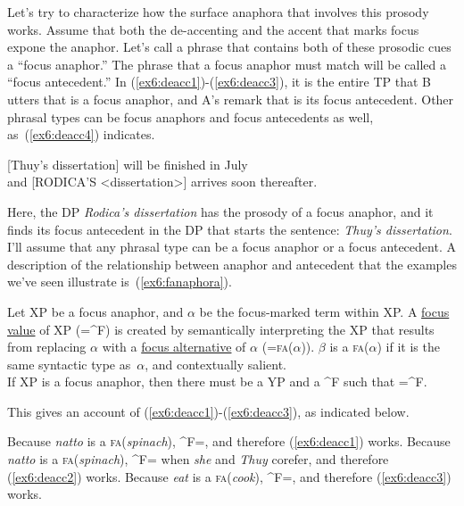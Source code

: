 Let's try to characterize how the surface anaphora that involves this prosody works. Assume that both the de-accenting and the accent that marks focus expone the anaphor. Let's call a phrase that contains both of these prosodic cues a ``focus anaphor.''  %
%
%
%
The phrase that a focus anaphor must match will be called a ``focus antecedent.'' In (\ref{ex6:deacc1})-(\ref{ex6:deacc3}), it is the entire TP that B utters that is a focus anaphor, and A's remark that is its focus antecedent. Other phrasal types can be focus anaphors and focus antecedents as well, as~(\ref{ex6:deacc4}) indicates.
\begin{exe}
	\raggedright
	\ex \label{ex6:deacc4}
	{}[\DP Thuy's dissertation] will be finished in July\\ and [\DP RODICA'S <dissertation>] arrives soon thereafter.
\end{exe}
Here, the DP \emph{Rodica's dissertation} has the prosody of a focus anaphor, and it finds its focus antecedent in the DP that starts the sentence: \emph{Thuy's dissertation}. I'll assume that any phrasal type can be a focus anaphor or a focus antecedent. A description of the relationship between anaphor and antecedent that the examples we've seen illustrate is~(\ref{ex6:fanaphora}).
\begin{exe}
	\raggedright
	\ex \label{ex6:fanaphora} Let XP be a focus anaphor, and $\alpha$ be the focus-marked term within XP. A \underline{focus value} of XP (=^{F}) is created by semantically interpreting the XP that results from replacing $\alpha$ with a \underline{focus alternative} of $\alpha$ (=\textsc{fa}($\alpha$)). $\beta$ is a \textsc{fa}($\alpha$) if it is the same syntactic type as~$\alpha$, and contextually salient.\\[4pt]
	If XP is a focus anaphor, then there must be a YP and a ^F such that =^F.
\end{exe}
This gives an account of (\ref{ex6:deacc1})-(\ref{ex6:deacc3}), as indicated below.
\begin{exe}
	\raggedright
	\ex \label{ex6:d1} Because \emph{natto} is a \textsc{fa}(\emph{spinach}), ^F=, and therefore (\ref{ex6:deacc1}) works.
	\ex \label{ex6:d2} Because \emph{natto} is a \textsc{fa}(\emph{spinach}), ^F= when \emph{she} and \emph{Thuy} corefer, and therefore (\ref{ex6:deacc2}) works.
	\ex \label{ex6:d3} Because \emph{eat} is a \textsc{fa}(\emph{cook}), ^F=, and therefore (\ref{ex6:deacc3}) works.
\end{exe}

